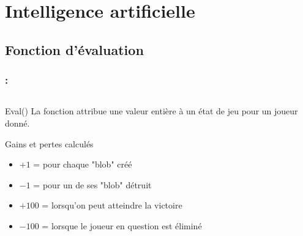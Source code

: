 \documentclass[9pt]{beamer}
\begin{document}
\section{Intelligence artificielle}

\subsection{Fonction d'évaluation}

\begin{frame}[fragile]
\frametitle{\insertsectionhead : \insertsubsectionhead}

\begin{columns}

\begin{column}{4cm}
\begin{center}
\begin{block}{Eval()}
La fonction attribue une valeur entière à un état de jeu pour un joueur donné.
\end{block}
\begin{block}{Gains et pertes calculés}
\begin{itemize}
    \item $+1$ = pour chaque "blob" créé
    \item $-1$ = pour un de ses "blob" détruit
    \item $+100$ = lorsqu'on peut atteindre la victoire
    \item $-100$ = lorsque le joueur en question est éliminé
\end{itemize}
\end{block}
\end{center}
\end{column}


\end{columns}
\end{frame}
\end{document}
